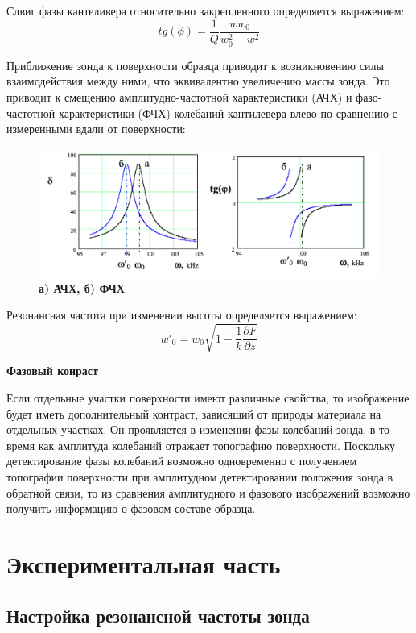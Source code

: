 \documentclass[a4paper]{article}
\begin{document}
Сдвиг фазы кантеливера относительно закрепленного определяется выражением:
\begin{equation}
tg(\phi) = \frac{1}{Q}\frac{w w_0}{w^2_0 - w^2}
\end{equation}

Приближение зонда к поверхности образца приводит к возникновению силы взаимодействия между ними, что эквивалентно увеличению массы зонда. Это приводит к смещению амплитудно-частотной характеристики (АЧХ) и фазо-частотной характеристики (ФЧХ) колебаний кантилевера влево по сравнению с измеренными вдали от поверхности:

 \begin{figure}[H]
\centering
	\includegraphics[width=0.9\linewidth]{pic4.png}
		\caption{{\bf {а) АЧХ, б) ФЧХ }}}
   	\label{fig:4}
\end{figure}

Резонансная частота при изменении высоты определяется выражением: 
\begin{equation}
w'_0 = w_0\sqrt{1 - \frac{1}{k}\frac{\partial F}{\partial z}}
\end{equation}

\textbf{Фазовый конраст}

Если отдельные участки поверхности имеют различные свойства, то изображение будет иметь дополнительный контраст, зависящий от природы материала на отдельных участках. Он проявляется в изменении фазы колебаний зонда, в то время как амплитуда колебаний отражает топографию поверхности. Поскольку детектирование фазы колебаний возможно одновременно с получением топографии поверхности при амплитудном детектировании положения зонда в обратной связи, то из сравнения амплитудного и фазового изображений возможно получить информацию о фазовом составе образца.


\section{Экспериментальная часть}

\subsection{Настройка резонансной частоты зонда}
\end{document}

